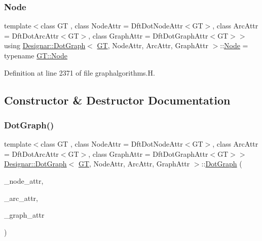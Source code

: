 \subsubsection{\texorpdfstring{Node}{Node}}
{\footnotesize\ttfamily template$<$class GT , class Node\+Attr  = Dft\+Dot\+Node\+Attr$<$\+G\+T$>$, class Arc\+Attr  = Dft\+Dot\+Arc\+Attr$<$\+G\+T$>$, class Graph\+Attr  = Dft\+Dot\+Graph\+Attr$<$\+G\+T$>$$>$ \\
using \hyperlink{class_designar_1_1_dot_graph}{Designar\+::\+Dot\+Graph}$<$ \hyperlink{demo-buildgraph_8_c_a3001c40d2c31ca87ed96cd7d1334a55e}{GT}, Node\+Attr, Arc\+Attr, Graph\+Attr $>$\+::\hyperlink{class_designar_1_1_dot_graph_a591d14a84a622be5bdcc190543c8ca46}{Node} =  typename \hyperlink{class_designar_1_1_graph_a5dfc7dba9d092ac489c72e40390c37d0}{G\+T\+::\+Node}}



Definition at line 2371 of file graphalgorithms.\+H.



\subsection{Constructor \& Destructor Documentation}
\mbox{\label{class_designar_1_1_dot_graph_a6173edee577a1311c20f6d6bba5e2673}} 
\subsubsection{\texorpdfstring{Dot\+Graph()}{DotGraph()}\hspace{0.1cm}{\footnotesize\ttfamily [1/2]}}
{\footnotesize\ttfamily template$<$class GT , class Node\+Attr  = Dft\+Dot\+Node\+Attr$<$\+G\+T$>$, class Arc\+Attr  = Dft\+Dot\+Arc\+Attr$<$\+G\+T$>$, class Graph\+Attr  = Dft\+Dot\+Graph\+Attr$<$\+G\+T$>$$>$ \\
\hyperlink{class_designar_1_1_dot_graph}{Designar\+::\+Dot\+Graph}$<$ \hyperlink{demo-buildgraph_8_c_a3001c40d2c31ca87ed96cd7d1334a55e}{GT}, Node\+Attr, Arc\+Attr, Graph\+Attr $>$\+::\hyperlink{class_designar_1_1_dot_graph}{Dot\+Graph} (\begin{DoxyParamCaption}\item[{Node\+Attr \&}]{\+\_\+node\+\_\+attr,  }\item[{Arc\+Attr \&}]{\+\_\+arc\+\_\+attr,  }\item[{Graph\+Attr \&}]{\+\_\+graph\+\_\+attr }\end{DoxyParamCaption})\hspace{0.3cm}{\ttfamily [inline]}}



